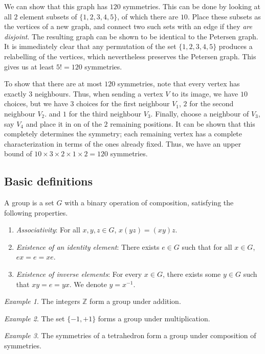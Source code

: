 \documentclass[11pt]{article}
\newcommand{\Z}{\mathbb{Z}}
\theoremstyle{definition}
\theoremstyle{remark}
\newtheorem*{example}{Example}
\numberwithin{equation}{section}
\begin{document}
    We can show that this graph has $120$ symmetries. This can be done by looking at
    all $2$ element subsets of $\{1, 2, 3, 4, 5\}$, of which there are $10$. Place
    these subsets as the vertices of a new graph, and connect two such sets with an
    edge if they \emph{are disjoint}. The resulting graph can be shown to be
    identical to the Petersen graph. It is immediately clear that any permutation of
    the set $\{1, 2, 3, 4, 5\}$ produces a relabelling of the vertices, which
    nevertheless preserves the Petersen graph. This gives us at least $5! = 120$
    symmetries.

    To show that there are at most $120$ symmetries, note that every vertex has
    exactly 3 neighbours. Thus, when sending a vertex $V$ to its image, we have $10$
    choices, but we have $3$ choices for the first neighbour $V_1$, $2$ for the
    second neighbour $V_2$. and $1$ for the third neighbour $V_3$. Finally, choose a
    neighbour of $V_3$, say $V_4$ and place it in on of the $2$ remaining positions.
    It can be shown that this completely determines the symmetry; each remaining
    vertex has a complete characterization in terms of the ones already fixed. Thus,
    we have an upper bound of $10 \times 3 \times 2 \times 1 \times 2 = 120$
    symmetries.
    

    \subsection{Basic definitions}
    \begin{definition}
        A group is a set $G$ with a binary operation of composition, satisfying the
        following properties.
        \begin{enumerate}
        \itemsep0em
            \item \emph{Associativity}: For all $x, y, z \in G$, $x(yz) = (xy)z$.
            \item \emph{Existence of an identity element}: There exists $e \in G$
            such that for all $x \in G$, $ex = e = xe$.
            \item \emph{Existence of inverse elements}: For every $x \in G$, there
            exists some $y \in G$ such that $xy = e = yx$. We denote $y = x^{-1}$.
        \end{enumerate}
    \end{definition}
    \begin{example}
        The integers $\Z$ form a group under addition.
    \end{example}
    \begin{example}
        The set $\{-1, +1\}$ forms a group under multiplication.
    \end{example}
    \begin{example}
        The symmetries of a tetrahedron form a group under composition of symmetries.
    \end{example}
\end{document}
